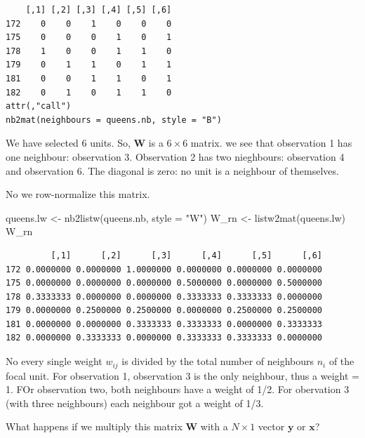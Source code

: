 \documentclass[
  letterpaper,
]{scrbook}
\newenvironment{Shaded}{\begin{snugshade}}{\end{snugshade}}
\newcommand{\AttributeTok}[1]{\textcolor[rgb]{0.40,0.45,0.13}{#1}}
\newcommand{\FunctionTok}[1]{\textcolor[rgb]{0.28,0.35,0.67}{#1}}
\newcommand{\NormalTok}[1]{\textcolor[rgb]{0.00,0.23,0.31}{#1}}
\newcommand{\OtherTok}[1]{\textcolor[rgb]{0.00,0.23,0.31}{#1}}
\newcommand{\StringTok}[1]{\textcolor[rgb]{0.13,0.47,0.30}{#1}}
\begin{document}
\begin{verbatim}
    [,1] [,2] [,3] [,4] [,5] [,6]
172    0    0    1    0    0    0
175    0    0    0    1    0    1
178    1    0    0    1    1    0
179    0    1    1    0    1    1
181    0    0    1    1    0    1
182    0    1    0    1    1    0
attr(,"call")
nb2mat(neighbours = queens.nb, style = "B")
\end{verbatim}

We have selected 6 units. So, \(\boldsymbol{\mathbf{W}}\) is a
\(6 \times 6\) matrix. we see that observation 1 has one neighbour:
observation 3. Observation 2 has two nieghbours: observation 4 and
observation 6. The diagonal is zero: no unit is a neighbour of
themselves.

No we row-normalize this matrix.

\begin{Shaded}
\begin{Highlighting}[]
\NormalTok{queens.lw }\OtherTok{\textless{}{-}} \FunctionTok{nb2listw}\NormalTok{(queens.nb,}
                      \AttributeTok{style =} \StringTok{"W"}\NormalTok{)}
\NormalTok{W\_rn }\OtherTok{\textless{}{-}} \FunctionTok{listw2mat}\NormalTok{(queens.lw)}
\NormalTok{W\_rn}
\end{Highlighting}
\end{Shaded}

\begin{verbatim}
         [,1]      [,2]      [,3]      [,4]      [,5]      [,6]
172 0.0000000 0.0000000 1.0000000 0.0000000 0.0000000 0.0000000
175 0.0000000 0.0000000 0.0000000 0.5000000 0.0000000 0.5000000
178 0.3333333 0.0000000 0.0000000 0.3333333 0.3333333 0.0000000
179 0.0000000 0.2500000 0.2500000 0.0000000 0.2500000 0.2500000
181 0.0000000 0.0000000 0.3333333 0.3333333 0.0000000 0.3333333
182 0.0000000 0.3333333 0.0000000 0.3333333 0.3333333 0.0000000
\end{verbatim}

No every single weight \(w_{ij}\) is divided by the total number of
neighbours \(n_i\) of the focal unit. For observation 1, observation 3
is the only neighbour, thus a weight = 1. FOr observation two, both
neighbours have a weight of 1/2. For obervation 3 (with three
neighbours) each neighbour got a weight of 1/3.

\begin{tcolorbox}[enhanced jigsaw, colframe=quarto-callout-tip-color-frame, coltitle=black, titlerule=0mm, opacitybacktitle=0.6, toprule=.15mm, colbacktitle=quarto-callout-tip-color!10!white, toptitle=1mm, leftrule=.75mm, colback=white, bottomtitle=1mm, opacityback=0, left=2mm, title=\textcolor{quarto-callout-tip-color}{\faLightbulb}\hspace{0.5em}{Question}, breakable, arc=.35mm, rightrule=.15mm, bottomrule=.15mm]

What happens if we multiply this matrix \(\boldsymbol{\mathbf{W}}\) with
a \(N \times 1\) vector \(\boldsymbol{\mathbf{y}}\) or
\(\boldsymbol{\mathbf{x}}\)?

\end{tcolorbox}
\end{document}
